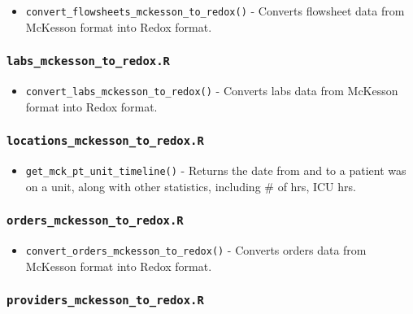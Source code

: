 \documentclass[
]{book}
\providecommand{\tightlist}{%
  \setlength{\itemsep}{0pt}\setlength{\parskip}{0pt}}
\begin{document}
\begin{itemize}
\tightlist
\item
  \texttt{convert\_flowsheets\_mckesson\_to\_redox()} - Converts flowsheet data from McKesson format into Redox format.
\end{itemize}

\hypertarget{labs_mckesson_to_redox.r}{%
\subsubsection{\texorpdfstring{\texttt{labs\_mckesson\_to\_redox.R}}{labs\_mckesson\_to\_redox.R}}\label{labs_mckesson_to_redox.r}}

\begin{itemize}
\tightlist
\item
  \texttt{convert\_labs\_mckesson\_to\_redox()} - Converts labs data from McKesson format into Redox format.
\end{itemize}

\hypertarget{locations_mckesson_to_redox.r}{%
\subsubsection{\texorpdfstring{\texttt{locations\_mckesson\_to\_redox.R}}{locations\_mckesson\_to\_redox.R}}\label{locations_mckesson_to_redox.r}}

\begin{itemize}
\tightlist
\item
  \texttt{get\_mck\_pt\_unit\_timeline()} - Returns the date from and to a patient was on a unit, along with other statistics, including \# of hrs, ICU hrs.
\end{itemize}

\hypertarget{orders_mckesson_to_redox.r}{%
\subsubsection{\texorpdfstring{\texttt{orders\_mckesson\_to\_redox.R}}{orders\_mckesson\_to\_redox.R}}\label{orders_mckesson_to_redox.r}}

\begin{itemize}
\tightlist
\item
  \texttt{convert\_orders\_mckesson\_to\_redox()} - Converts orders data from McKesson format into Redox format.
\end{itemize}

\hypertarget{providers_mckesson_to_redox.r}{%
\subsubsection{\texorpdfstring{\texttt{providers\_mckesson\_to\_redox.R}}{providers\_mckesson\_to\_redox.R}}\label{providers_mckesson_to_redox.r}}
\end{document}
